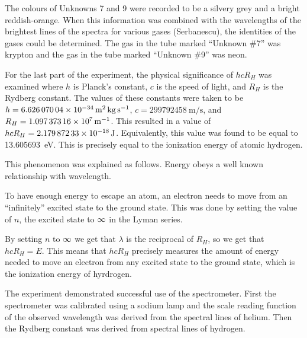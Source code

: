 \begin{paper}
The colours of Unknowns 7 and 9 were recorded to be a silvery grey and a bright reddish-orange.
When this information was combined with the wavelengths of the brightest lines of the spectra for
various gases (Serbanescu), the identities of the gases could be determined.
The gas in the tube marked ``Unknown \#7'' was krypton and the gas in the tube marked ``Unknown \#9'' was neon.

For the last part of the experiment, the physical significance of $hcR_H$ was examined where $h$ is Planck's constant,
$c$ is the speed of light, and $R_H$ is the Rydberg constant.
The values of these constants were taken to be $h=\SI{6.62607004E-34}{\meter\squared\kilo\gram\per\second}$, $c=\SI{299792458}{\meter\per\second}$, and $R_H=\SI{1.09737316E7}{\per\meter}$.
This resulted in a value of $hcR_H=\SI{2.17987233E-18}{\joule}$.
Equivalently, this value was found to be equal to \SI{13.605693}{\electronvolt}.
This is precisely equal to the ionization energy of atomic hydrogen.

This phenomenon was explained as follows.
Energy obeys a well known relationship with wavelength.

\begin{paperwhere}
\end{paperwhere}

To have enough energy to escape an atom, an electron needs to move from an ``infinitely'' excited state to the ground state.
This was done by setting the value of $n$, the excited state to $\infty$ in the Lyman series.


By setting $n$ to $\infty$ we get that $\lambda$ is the reciprocal of $R_H$, so we get that $hcR_H=E$.
This means that $hcR_H$ precisely measures the amount of energy needed to move an electron from any excited state to the ground state, which is the ionization energy of hyrdrogen.


The experiment demonstrated successful use of the spectrometer.
First the spectrometer was calibrated using a sodium lamp and the scale reading function of the observed wavelength was derived from the spectral lines of helium.
Then the Rydberg constant was derived from spectral lines of hydrogen.


\end{paper}
